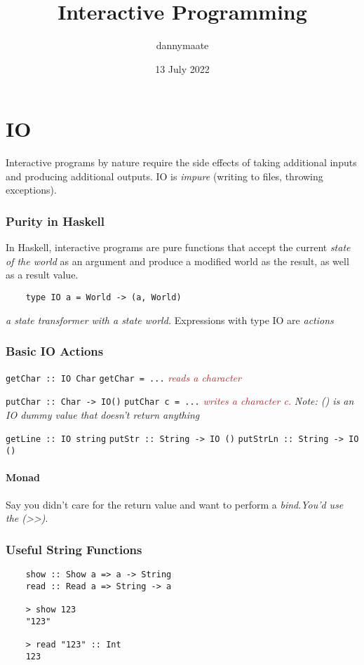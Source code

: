 \documentclass{article}
\title{Interactive Programming}
\author{dannymaate}
\date{13 July 2022}
\begin{document}
\maketitle

\section{IO}
Interactive programs by nature require the side effects of taking additional inputs and producing additional outputs. IO is \textcolor{Rhodamine}{\emph{impure}} (writing to files, throwing exceptions).

\subsubsection*{Purity in Haskell}
In Haskell, interactive programs are pure functions that accept the current \emph{state of the world} as an argument and produce a modified world as the result, as well as a result value.

\begin{verbatim}
    type IO a = World -> (a, World)
\end{verbatim}
\emph{a state transformer with a state world.}
Expressions with type IO are \textcolor{Rhodamine}{\emph{actions}}

\subsubsection*{Basic IO Actions}
\texttt{getChar :: IO Char} \newline
\texttt{getChar = ...} \emph{\textcolor{Brown}{reads a character}} \newline

\noindent \texttt{putChar :: Char -> IO()} \newline
\texttt{putChar c = ...} \emph{\textcolor{Brown}{writes a character c.}}
\textcolor{Rhodamine}{\emph{Note: () is an IO dummy value that doesn't return anything}} \newline

\noindent \texttt{getLine :: IO string} \newline
\noindent \texttt{putStr :: String -> IO ()} \newline
\noindent \texttt{putStrLn :: String -> IO ()}

\paragraph{Monad}
Say you didn't care for the return value and want to perform a \textcolor{Rhodamine}{\emph{bind}}.\textcolor{Emerald}{\emph{You'd use the (>>)}}.

\subsubsection*{Useful String Functions}
\begin{verbatim}
    show :: Show a => a -> String
    read :: Read a => String -> a

    > show 123
    "123"

    > read "123" :: Int
    123



\end{verbatim}
\end{document}
